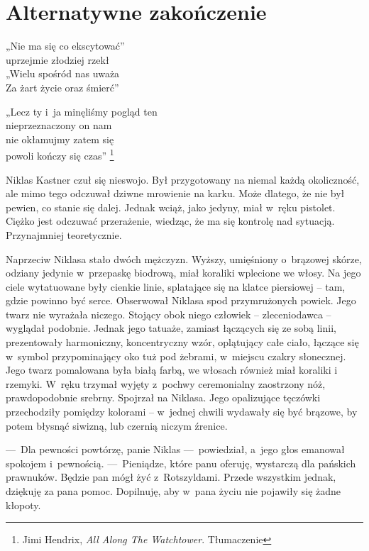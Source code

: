 \chapter{Alternatywne zakończenie}

\begin{itquote}
„Nie ma się co ekscytować”\\
uprzejmie złodziej rzekł\\
„Wielu spośród nas uważa\\
Za żart życie oraz śmierć”

\vspace{.5em}

„Lecz ty i~ja minęliśmy pogląd ten\\
nieprzeznaczony on nam\\
nie okłamujmy zatem się\\
powoli kończy się czas”
\footnote{Jimi Hendrix, \emph{All Along The Watchtower}. Tłumaczenie }
\end{itquote}

Niklas Kastner czuł się nieswojo. Był przygotowany na niemal każdą okoliczność, ale mimo tego odczuwał dziwne 
mrowienie na karku. Może dlatego, że nie był pewien, co stanie się dalej. Jednak wciąż, jako jedyny, miał w~ręku 
pistolet. Ciężko jest odczuwać przerażenie, wiedząc, że ma się kontrolę nad sytuacją. Przynajmniej teoretycznie.

Naprzeciw Niklasa stało dwóch mężczyzn. Wyższy, umięśniony o~brązowej skórze, odziany jedynie w~przepaskę biodrową, 
miał koraliki wplecione we włosy. Na jego ciele wytatuowane były cienkie linie, splatające się na klatce piersiowej --
 tam, gdzie powinno być serce. Obserwował Niklasa spod przymrużonych powiek. Jego twarz nie wyrażała niczego. Stojący 
obok niego człowiek -- zleceniodawca -- wyglądał podobnie. Jednak jego tatuaże, zamiast łączących się ze sobą linii, 
prezentowały harmoniczny, koncentryczny wzór, oplątujący całe ciało, łączące się w~symbol przypominający oko tuż pod 
żebrami, w~miejscu czakry słonecznej. Jego twarz pomalowana była białą farbą, we włosach również miał koraliki i~
rzemyki. W~ręku trzymał wyjęty z~pochwy ceremonialny zaostrzony nóż, prawdopodobnie srebrny. Spojrzał na Niklasa. 
Jego opalizujące tęczówki przechodziły pomiędzy kolorami -- w~jednej chwili wydawały się być brązowe, by potem 
błysnąć siwizną, lub czernią niczym źrenice.

---~Dla pewności powtórzę, panie Niklas ---~powiedział, a~jego głos emanował spokojem i~pewnością. ---~Pieniądze, 
które panu oferuję, wystarczą dla pańskich prawnuków. Będzie pan mógł żyć z~Rotszyldami. Przede wszystkim jednak, 
dziękuję za pana pomoc. Dopilnuję, aby w~pana życiu nie pojawiły się żadne kłopoty. 

